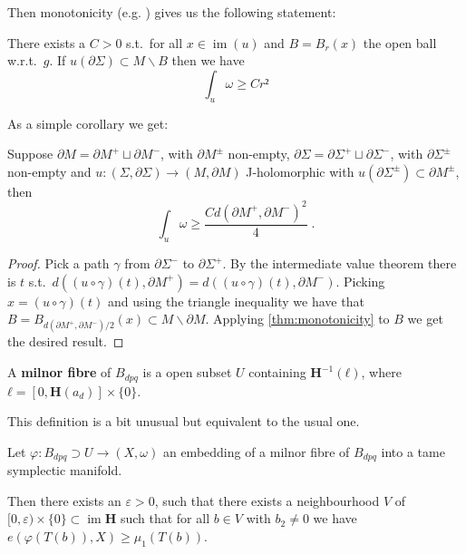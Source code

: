 \documentclass[12pt,a4paper,draft]{scrartcl}
\DeclareMathOperator{\im}{im}
\begin{document}
Then monotonicity (e.g. \cite[Proposition 4.3.1 (ii)]{sikorav1994}) gives us the following statement:

\begin{lemma}[Monotonicity]
  \label{thm:monotonicity}
  There exists a $C>0$ s.t.\ for all $x ∈ \im(u)$ and $B = B_r(x)$ the open ball w.r.t.\ $g$. If $u(∂Σ) ⊂ M ∖ B$ then we have
  \[∫_u ω ≥ C r²\]
\end{lemma}

As a simple corollary we get:

\begin{corollary}
  \label{cor:small_buffer}
  Suppose $∂M = ∂M^+ ⊔ ∂M^-$, with $∂M^±$ non-empty, $∂Σ = ∂Σ^+ ⊔ ∂Σ^-$, with $∂Σ^±$ non-empty and $u\colon (Σ,∂Σ) → (M,∂M)$ J-holomorphic with $u(∂Σ^±) ⊂ ∂M^±$, then
  \[∫_u ω ≥ \frac{C d(∂M^+,∂M^-)^2}{4} \; .\]
\end{corollary}

\begin{proof}
  Pick a path $γ$ from $∂Σ^-$ to $∂Σ^+$. By the intermediate value theorem there is $t$ s.t.\ $d((u ∘ γ) (t),∂M^+) = d((u ∘ γ)(t), ∂M^-)$. Picking $x = (u ∘ γ)(t)$ and using the triangle inequality we have that $B = B_{d(∂M^+,∂M^-)/2}(x) ⊂ M ∖ ∂M $. Applying \cref{thm:monotonicity} to $B$ we get the desired result.
\end{proof}

\begin{definition}
A \textbf{milnor fibre} of $B_{dpq}$ is a open subset $U$ containing $\symbf{H}^{-1}(ℓ)$, where $ℓ = [0,\symbf{H}(a_d)] × \{0\}$. \end{definition}

\begin{remark}
  This definition is a bit unusual but equivalent to the usual one.
\end{remark}

\begin{proposition}
  \label{thm:lower_bound_embedded}
  Let $φ:B_{dpq} ⊃ U → (X,ω)$ an embedding of a milnor fibre of $B_{dpq}$ into a tame symplectic manifold.

  Then there exists an $ε>0$, such that there exists a neighbourhood $V$ of $[0,ε) × \{0\} ⊂ \im{\symbf{H}}$ such that for all $b ∈ V$ with $b_2 ≠ 0$ we have $e(φ(T(b)),X) ≥ μ_1(T(b))$.
\end{proposition}
\end{document}

